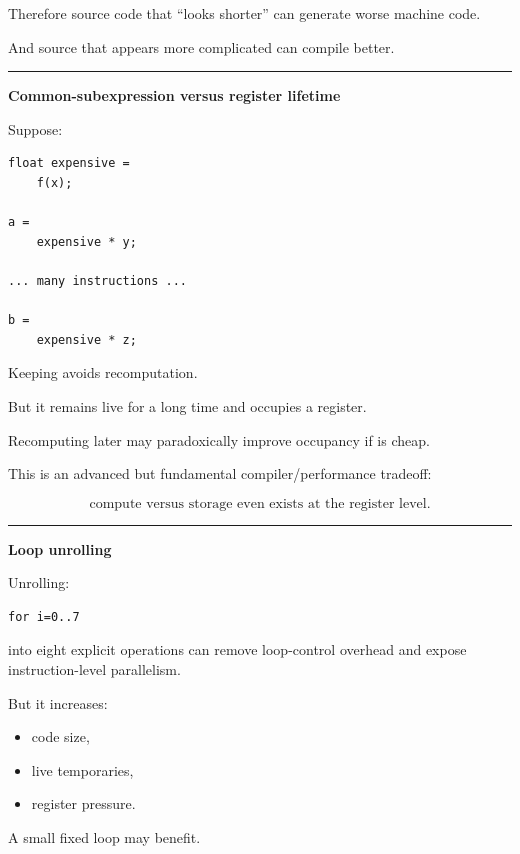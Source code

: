 Therefore source code that ``looks shorter'' can generate worse machine code.

And source that appears more complicated can compile better.

\begin{center}\rule{0.5\linewidth}{0.5pt}\end{center}

\textbf{Common-subexpression versus register lifetime}

Suppose:

\protect{}\label{p10-cse}%
\begin{verbatim}
float expensive =
    f(x);

a =
    expensive * y;

... many instructions ...

b =
    expensive * z;
\end{verbatim}

Keeping  avoids recomputation.

But it remains live for a long time and occupies a register.

Recomputing  later may paradoxically improve occupancy if  is cheap.

This is an advanced but fundamental compiler/performance tradeoff:

\[
\boxed{
\text{compute versus storage even exists at the register level}.
}
\]

\begin{center}\rule{0.5\linewidth}{0.5pt}\end{center}

\textbf{Loop unrolling}

Unrolling:

\protect{}\label{p10-unroll}%
\begin{verbatim}
for i=0..7
\end{verbatim}

into eight explicit operations can remove loop-control overhead and expose instruction-level parallelism.

But it increases:

\begin{itemize}
\tightlist
\item
  code size,
\item
  live temporaries,
\item
  register pressure.
\end{itemize}

A small fixed loop may benefit.

